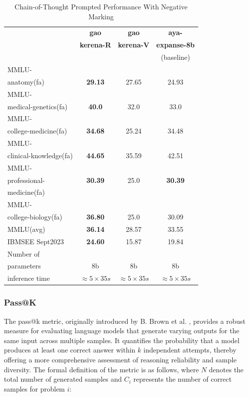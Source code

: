 \documentclass[conference]{IEEEtran}
\begin{document}
	\begin{table}[ht]
		\centering
		\caption{Chain-of-Thought Prompted Performance With Negative Marking}
		\begin{tabular}{|l|c|c|c|}  
			\hline
			\textbf{} & \textbf{gao} & \textbf{gao} & \textbf{aya-} \\ 
			& \textbf{kerena-R} &  \textbf{kerena-V} & \textbf{expanse-8b} \\
			&   & &(baseline)  \\ \hline
			MMLU- &  &  &  \\ 
			anatomy(fa)  & \textbf{29.13} & 27.65  & 24.93  \\ \hline
			MMLU- &    &  &  \\
			medical-genetics(fa) & \textbf{40.0}  & 32.0  & 33.0  \\ \hline
			MMLU- &  &    &  \\
			college-medicine(fa) & \textbf{34.68}  & 25.24  & 34.48  \\ \hline
			MMLU- &    &  &  \\
			clinical-knowledge(fa)& \textbf{44.65} & 35.59  & 42.51  \\ \hline
			MMLU- &  &  &  \\
			professional-& \textbf{30.39} & 25.0 & \textbf{30.39}   \\
                        medicine(fa)& &  &  \\ \hline
			MMLU- &  &  &  \\
			college-biology(fa)& \textbf{36.80} & 25.0  & 30.09  \\ \hline
			MMLU(avg) & \textbf{36.14} & 28.57  & 33.55  \\ \hline
			IBMSEE Sept2023 & \textbf{24.60}  & 15.87 & 19.84   \\ \hline
			Number of&  &  &  \\
			parameters & 8b & 8b & 8b \\ \hline
			inference time & $\approx 5 \times 35s$ & $\approx 5 \times 35s$ & $\approx 5 \times 35s$ \\  \hline
		\end{tabular}
		\label{tab:med_reasoning_capabillities_NM_comparison}
	\end{table}
           
           \subsubsection{Pass@K}
The pass@k metric, originally introduced by B. Brown et al.
\cite{b25}, 
provides a robust measure for evaluating language models that generate varying outputs for the same input across multiple samples. It quantifies the probability that a model produces at least one correct answer within \(k\) independent attempts, thereby offering a more comprehensive assessment of reasoning reliability and sample diversity. The formal definition of the metric is as follows, where \(N\) denotes the total number of generated samples and \(C_i\) represents the number of correct samples for problem \(i\):
\end{document}
